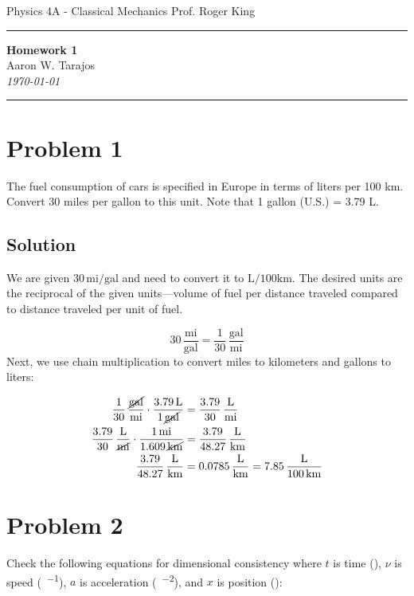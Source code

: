 \documentclass{article}
\newcommand{\mile}{\text{mi}}
\newcommand{\gallon}{\text{gal}}
\newcommand{\kilo}{\text{k}}
\newcommand{\liter}{\text{L}}
\newcommand{\meter}{\text{m}}
\newcommand{\second}{\text{s}}
\begin{document}
\noindent
Physics 4A - Classical Mechanics \hfill Prof. Roger King

\noindent\rule{\textwidth}{0.4pt}

\begin{center}
    \textbf{\LARGE Homework 1} \\
    \vspace{12pt}
    \large Aaron W. Tarajos \\
    \textit{\today}
\end{center}

\noindent\rule{\textwidth}{0.4pt}

\section*{Problem 1}
The fuel consumption of cars is specified in Europe in terms of liters per 100 km. Convert
30 miles per gallon to this unit. Note that 1 gallon (U.S.) = 3.79 L.

\subsection*{Solution}
We are given \(30 \, \si{\mile\per\gallon}\) and need to convert it to \(\si{\liter\per100\kilo\meter}\). The desired units are the reciprocal of the given units—volume of fuel per distance traveled compared to distance traveled per unit of fuel.

\[
30 \, \frac{\mile}{\gallon} = \frac{1}{30} \, \frac{\gallon}{\mile}
\]
Next, we use chain multiplication to convert miles to kilometers and gallons to liters:

\begin{align*}
\frac{1}{30} \, \frac{\cancel{\gallon}}{\mile} \cdot \frac{3.79 \, \liter}{1 \, \cancel{\gallon}} &= \frac{3.79}{30} \, \frac{\liter}{\mile} \\
\frac{3.79}{30} \, \frac{\liter}{\cancel{\mile}} \cdot \frac{1 \, \mile}{1.609 \, \cancel{\kilo\meter}} &= \frac{3.79}{48.27} \, \frac{\liter}{\kilo\meter} \\
\frac{3.79}{48.27} \, \frac{\liter}{\kilo\meter} &= 0.0785 \, \frac{\liter}{\kilo\meter} = 7.85 \, \frac{\liter}{100 \, \kilo\meter}
\end{align*}

\section*{Problem 2}
Check the following equations for dimensional consistency where \( t \) is time (\si{\second}), \( \nu \) is speed (\si{\meter\per\second}), \( a \) is acceleration (\si{\meter\per\second^2}), and \( x \) is position (\si{\meter}):
\end{document}
